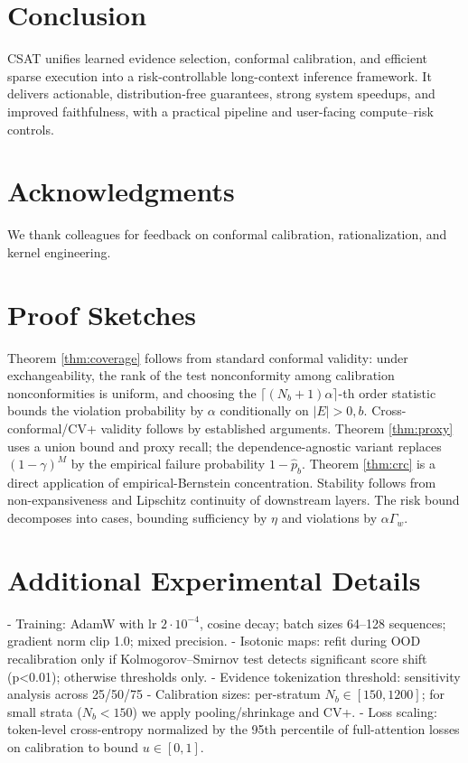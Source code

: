 \documentclass[11pt]{article}
\begin{document}
\section{Conclusion}
CSAT unifies learned evidence selection, conformal calibration, and efficient sparse execution into a risk-controllable long-context inference framework. It delivers actionable, distribution-free guarantees, strong system speedups, and improved faithfulness, with a practical pipeline and user-facing compute–risk controls.

\section*{Acknowledgments}
We thank colleagues for feedback on conformal calibration, rationalization, and kernel engineering.

\appendix

\section{Proof Sketches}
Theorem \ref{thm:coverage} follows from standard conformal validity: under exchangeability, the rank of the test nonconformity among calibration nonconformities is uniform, and choosing the $\lceil (N_b+1)\alpha\rceil$-th order statistic bounds the violation probability by $\alpha$ conditionally on $|E|>0,b$. Cross-conformal/CV+ validity follows by established arguments. Theorem \ref{thm:proxy} uses a union bound and proxy recall; the dependence-agnostic variant replaces $(1-\gamma)^M$ by the empirical failure probability $1-\hat{p}_b$. Theorem \ref{thm:crc} is a direct application of empirical-Bernstein concentration. Stability follows from non-expansiveness and Lipschitz continuity of downstream layers. The risk bound decomposes into cases, bounding sufficiency by $\eta$ and violations by $\alpha \Gamma_w$.

\section{Additional Experimental Details}
- Training: AdamW with lr $2\cdot 10^{-4}$, cosine decay; batch sizes 64–128 sequences; gradient norm clip 1.0; mixed precision.
- Isotonic maps: refit during OOD recalibration only if Kolmogorov–Smirnov test detects significant score shift (p<0.01); otherwise thresholds only.
- Evidence tokenization threshold: sensitivity analysis across 25/50/75%
- Calibration sizes: per-stratum $N_b\in[150,1200]$; for small strata ($N_b<150$) we apply pooling/shrinkage and CV+.
- Loss scaling: token-level cross-entropy normalized by the 95th percentile of full-attention losses on calibration to bound $u\in[0,1]$.
\end{document}
